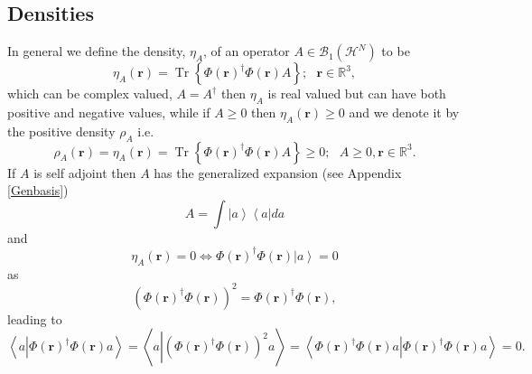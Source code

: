 \documentclass[aps,preprint]{revtex4}%
\begin{document}
\subsection{Densities \label{Gen. Den}}

\qquad In general we define the density, $\eta_{A}$, of an operator
$A\in\mathcal{B}_{1}\left(  \mathcal{H}^{N}\right)  $ to be
\begin{equation}
\eta_{A}\left(  \boldsymbol{r}\right)  =\operatorname{Tr}\left\{  \Phi\left(
\boldsymbol{r}\right)  ^{\dagger}\Phi\left(  \boldsymbol{r}\right)  A\right\}
;\text{ }\boldsymbol{r\in}\mathbb{R}^{3},
\end{equation}
which can be complex valued, $A=A^{\dagger}$ then $\eta_{A}$ is real valued
but can have both positive and negative values, while if $A\geq0$ then
$\eta_{A}\left(  \boldsymbol{r}\right)  \geq0$ and we denote it by the
positive density $\rho_{A}$ i.e.
\begin{equation}
\rho_{A}\left(  \boldsymbol{r}\right)  =\eta_{A}\left(  \boldsymbol{r}\right)
=\operatorname{Tr}\left\{  \Phi\left(  \boldsymbol{r}\right)  ^{\dagger}%
\Phi\left(  \boldsymbol{r}\right)  A\right\}  \geq0;\text{ }A\geq
0,\boldsymbol{r\in}\mathbb{R}^{3}.
\end{equation}
If $A$ is self adjoint then $A$ has the generalized expansion (see Appendix
\ref{Genbasis})
\begin{equation}
A=\int\left\vert a\right\rangle \left\langle a\right\vert da
\end{equation}
and
\begin{equation}
\eta_{A}\left(  \boldsymbol{r}\right)  =0\Leftrightarrow\Phi\left(
\boldsymbol{r}\right)  ^{\dagger}\Phi\left(  \boldsymbol{r}\right)  \left\vert
a\right\rangle =0
\end{equation}
as%
\begin{equation}
\left(  \Phi\left(  \boldsymbol{r}\right)  ^{\dagger}\Phi\left(
\boldsymbol{r}\right)  \right)  ^{2}=\Phi\left(  \boldsymbol{r}\right)
^{\dagger}\Phi\left(  \boldsymbol{r}\right)  ,
\end{equation}
leading to
\begin{equation}
\left\langle a\left\vert \Phi\left(  \boldsymbol{r}\right)  ^{\dagger}%
\Phi\left(  \boldsymbol{r}\right)  a\right.  \right\rangle =\left\langle
a\left\vert \left(  \Phi\left(  \boldsymbol{r}\right)  ^{\dagger}\Phi\left(
\boldsymbol{r}\right)  \right)  ^{2}a\right.  \right\rangle =\left\langle
\Phi\left(  \boldsymbol{r}\right)  ^{\dagger}\Phi\left(  \boldsymbol{r}%
\right)  a\left\vert \Phi\left(  \boldsymbol{r}\right)  ^{\dagger}\Phi\left(
\boldsymbol{r}\right)  a\right.  \right\rangle =0.
\end{equation}
\end{document}
